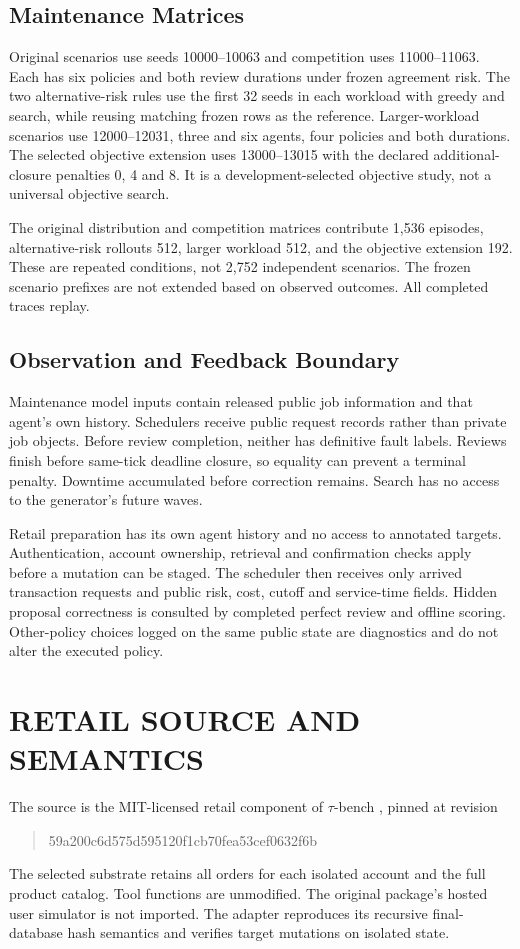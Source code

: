 \subsection{Maintenance Matrices}
Original scenarios use seeds 10000--10063 and competition uses 11000--11063. Each has six policies and both review durations under frozen agreement risk. The two alternative-risk rules use the first 32 seeds in each workload with greedy and search, while reusing matching frozen rows as the reference. Larger-workload scenarios use 12000--12031, three and six agents, four policies and both durations. The selected objective extension uses 13000--13015 with the declared additional-closure penalties 0, 4 and 8. It is a development-selected objective study, not a universal objective search.

The original distribution and competition matrices contribute 1,536 episodes, alternative-risk rollouts 512, larger workload 512, and the objective extension 192. These are repeated conditions, not 2,752 independent scenarios. The frozen scenario prefixes are not extended based on observed outcomes. All completed traces replay.

\subsection{Observation and Feedback Boundary}
Maintenance model inputs contain released public job information and that agent's own history. Schedulers receive public request records rather than private job objects. Before review completion, neither has definitive fault labels. Reviews finish before same-tick deadline closure, so equality can prevent a terminal penalty. Downtime accumulated before correction remains. Search has no access to the generator's future waves.

Retail preparation has its own agent history and no access to annotated targets. Authentication, account ownership, retrieval and confirmation checks apply before a mutation can be staged. The scheduler then receives only arrived transaction requests and public risk, cost, cutoff and service-time fields. Hidden proposal correctness is consulted by completed perfect review and offline scoring. Other-policy choices logged on the same public state are diagnostics and do not alter the executed policy.



\section{RETAIL SOURCE AND SEMANTICS}
\noindent The source is the MIT-licensed retail component of $\tau$-bench \cite{yao2024tau}, pinned at revision
\begin{quote}\small\ttfamily
59a200c6d575d595120f1cb70fea53cef0632f6b
\end{quote}
The selected substrate retains all orders for each isolated account and the full product catalog. Tool functions are unmodified. The original package's hosted user simulator is not imported. The adapter reproduces its recursive final-database hash semantics and verifies target mutations on isolated state.\draftcredit

